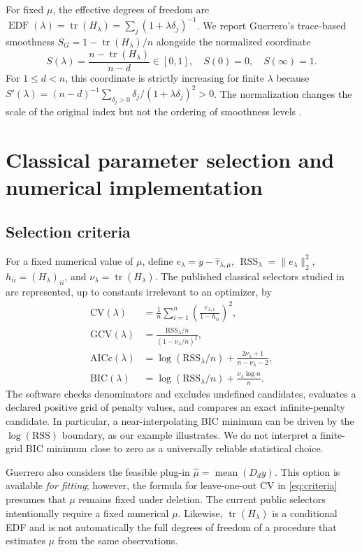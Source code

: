 \documentclass[pdflatex,sn-mathphys-ay]{sn-jnl}
\newcommand{\tr}{\operatorname{tr}}
\begin{document}
For fixed $\mu$, the effective degrees of freedom are $\operatorname{EDF}(\lambda)=\tr(H_\lambda)=\sum_j(1+\lambda\delta_j)^{-1}$. We report Guerrero's trace-based smoothness $S_G=1-\tr(H_\lambda)/n$ alongside the normalized coordinate
\begin{equation}\label{eq:smoothness}
 S(\lambda)=\frac{n-\tr(H_\lambda)}{n-d}\in[0,1],\quad S(0)=0,\quad S(\infty)=1.
\end{equation}
For $1\le d<n$, this coordinate is strictly increasing for finite $\lambda$ because $S'(\lambda)=(n-d)^{-1}\sum_{\delta_j>0}\delta_j/(1+\lambda\delta_j)^2>0$. The normalization changes the scale of the original index but not the ordering of smoothness levels \cite{guerrero2008smoothness}.

\section{Classical parameter selection and numerical implementation}
\subsection{Selection criteria}
For a fixed numerical value of $\mu$, define $e_\lambda=y-\widehat\tau_{\lambda,\mu}$, $\operatorname{RSS}_\lambda=\|e_\lambda\|_2^2$, $h_{ii}=(H_\lambda)_{ii}$, and $\nu_\lambda=\tr(H_\lambda)$. The published classical selectors studied in \cite{cortes2017smoothness} are represented, up to constants irrelevant to an optimizer, by
\begin{align}\label{eq:criteria}
 \mathrm{CV}(\lambda)&=\frac1n\sum_{i=1}^n\left(\frac{e_{\lambda,i}}{1-h_{ii}}\right)^2,\\
 \mathrm{GCV}(\lambda)&=\frac{\mathrm{RSS}_\lambda/n}{(1-\nu_\lambda/n)^2},\\
 \mathrm{AICc}(\lambda)&=\log(\mathrm{RSS}_\lambda/n)+\frac{2\nu_\lambda+1}{n-\nu_\lambda-2},\\
 \mathrm{BIC}(\lambda)&=\log(\mathrm{RSS}_\lambda/n)+\frac{\nu_\lambda\log n}{n}.
\end{align}
The software checks denominators and excludes undefined candidates, evaluates a declared positive grid of penalty values, and compares an exact infinite-penalty candidate. In particular, a near-interpolating BIC minimum can be driven by the $\log(\mathrm{RSS})$ boundary, as our example illustrates. We do not interpret a finite-grid BIC minimum close to zero as a universally reliable statistical choice.

Guerrero \cite{guerrero2007penalized} also considers the feasible plug-in $\widehat\mu=\operatorname{mean}(D_dy)$. This option is available \emph{for fitting}; however, the formula for leave-one-out CV in \eqref{eq:criteria} presumes that $\mu$ remains fixed under deletion. The current public selectors intentionally require a fixed numerical $\mu$. Likewise, $\tr(H_\lambda)$ is a conditional EDF and is not automatically the full degrees of freedom of a procedure that estimates $\mu$ from the same observations.
\end{document}
